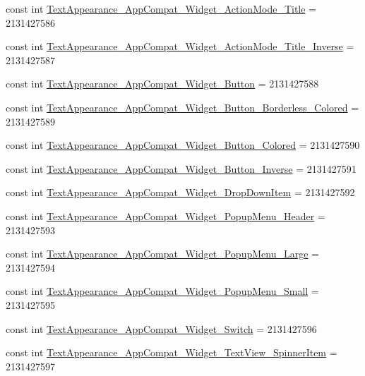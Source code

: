 \begin{CompactItemize}
const int \hyperlink{class__2doo_1_1_droid_1_1_resource_1_1_style_12b856e87495d5a4dc50ca72799688bc}{TextAppearance\_\-AppCompat\_\-Widget\_\-ActionMode\_\-Title} = 2131427586
\item 
const int \hyperlink{class__2doo_1_1_droid_1_1_resource_1_1_style_358c7998e9d4ca4e6ba3bfc3d72e1da7}{TextAppearance\_\-AppCompat\_\-Widget\_\-ActionMode\_\-Title\_\-Inverse} = 2131427587
\item 
const int \hyperlink{class__2doo_1_1_droid_1_1_resource_1_1_style_e2b415a309a86392361c2fd231f80c7f}{TextAppearance\_\-AppCompat\_\-Widget\_\-Button} = 2131427588
\item 
const int \hyperlink{class__2doo_1_1_droid_1_1_resource_1_1_style_1e32140379deb1f071be3182250a26fa}{TextAppearance\_\-AppCompat\_\-Widget\_\-Button\_\-Borderless\_\-Colored} = 2131427589
\item 
const int \hyperlink{class__2doo_1_1_droid_1_1_resource_1_1_style_6020054a009914ddfa6b97c800eb481e}{TextAppearance\_\-AppCompat\_\-Widget\_\-Button\_\-Colored} = 2131427590
\item 
const int \hyperlink{class__2doo_1_1_droid_1_1_resource_1_1_style_d2c493d7293419de7a6c323f32d2ec77}{TextAppearance\_\-AppCompat\_\-Widget\_\-Button\_\-Inverse} = 2131427591
\item 
const int \hyperlink{class__2doo_1_1_droid_1_1_resource_1_1_style_64b3e9da8155257062226cb0b0930fec}{TextAppearance\_\-AppCompat\_\-Widget\_\-DropDownItem} = 2131427592
\item 
const int \hyperlink{class__2doo_1_1_droid_1_1_resource_1_1_style_173a936314276b9af4bcb51bc3eabc5b}{TextAppearance\_\-AppCompat\_\-Widget\_\-PopupMenu\_\-Header} = 2131427593
\item 
const int \hyperlink{class__2doo_1_1_droid_1_1_resource_1_1_style_05f698c69136d35b29795f130fbfb5c8}{TextAppearance\_\-AppCompat\_\-Widget\_\-PopupMenu\_\-Large} = 2131427594
\item 
const int \hyperlink{class__2doo_1_1_droid_1_1_resource_1_1_style_400b7cbbcab1048936fc365191a35352}{TextAppearance\_\-AppCompat\_\-Widget\_\-PopupMenu\_\-Small} = 2131427595
\item 
const int \hyperlink{class__2doo_1_1_droid_1_1_resource_1_1_style_24cafe008a7554f5fa1859d7b40fe8df}{TextAppearance\_\-AppCompat\_\-Widget\_\-Switch} = 2131427596
\item 
const int \hyperlink{class__2doo_1_1_droid_1_1_resource_1_1_style_7ca5fd30dcb2df4f514a98cbef5933a9}{TextAppearance\_\-AppCompat\_\-Widget\_\-TextView\_\-SpinnerItem} = 2131427597

\end{CompactItemize}
